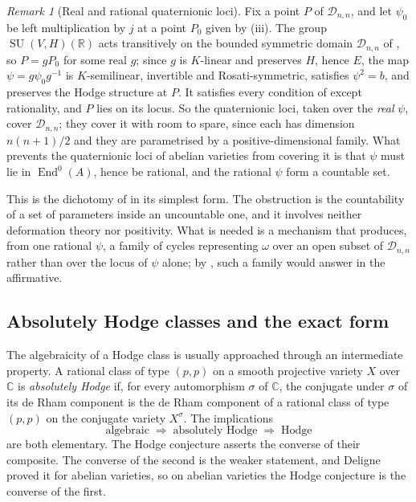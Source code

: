 \documentclass[11pt,reqno]{amsart}
\theoremstyle{plain}
\theoremstyle{definition}
\theoremstyle{remark}
\newtheorem{remark}[theorem]{Remark}
\newcommand{\RR}{\mathbb{R}}
\newcommand{\CC}{\mathbb{C}}
\newcommand{\cD}{\mathcal{D}}
\DeclareMathOperator{\End}{End}
\DeclareMathOperator{\SU}{SU}
\begin{document}
\begin{remark}[Real and rational quaternionic loci]%
\label{rem:onlyrational}
Fix a point $P$ of $\cD_{n,n}$, and let $\psi_{0}$ be left multiplication by
$j$ at a point $P_{0}$ given by (iii). The group
$\SU(V,H)(\RR)$ acts transitively on the bounded symmetric domain $\cD_{n,n}$
of , so $P=gP_{0}$ for some real $g$; since $g$ is
$K$-linear and preserves $H$, hence $E$, the map
$\psi=g\psi_{0}g^{-1}$ is $K$-semilinear, invertible and Rosati-symmetric,
satisfies $\psi^{2}=b$, and preserves the Hodge structure at $P$. It
satisfies every condition of  except rationality, and
$P$ lies on its locus. So the quaternionic loci, taken over the \emph{real}
$\psi$, cover $\cD_{n,n}$; they cover it with room to spare, since each has
dimension $n(n+1)/2$ and they are parametrised by a positive-dimensional
family. What prevents the quaternionic loci of abelian varieties from
covering it is that $\psi$ must lie in $\End^{0}(A)$, hence be rational, and
the rational $\psi$ form a countable set.

This is the dichotomy of  in its simplest form. The
obstruction is the countability of a set of parameters inside an uncountable
one, and it involves neither deformation theory nor positivity. What is
needed is a mechanism that produces, from one rational $\psi$, a family of
cycles representing $\omega$ over an open subset of $\cD_{n,n}$ rather than
over the locus of $\psi$ alone; by , such a family
would answer  in the affirmative.
\end{remark}

\subsection{Absolutely Hodge classes and the exact form}\label{ssec:exactform}

The algebraicity of a Hodge class is usually approached through an
intermediate property. A rational class of type $(p,p)$ on a smooth
projective variety $X$ over $\CC$ is \emph{absolutely Hodge} if, for every
automorphism $\sigma$ of $\CC$, the conjugate under $\sigma$ of its de Rham
component is the de Rham component of a rational class of type $(p,p)$ on the
conjugate variety $X^{\sigma}$. The implications
\begin{equation}\label{eq:threechain}
  \text{algebraic}
  \;\Longrightarrow\;
  \text{absolutely Hodge}
  \;\Longrightarrow\;
  \text{Hodge}
\end{equation}
are both elementary. The Hodge conjecture asserts the converse of their
composite. The converse of the second is the weaker statement, and Deligne
proved it for abelian varieties, so on abelian varieties the Hodge conjecture
is the converse of the first.
\end{document}
